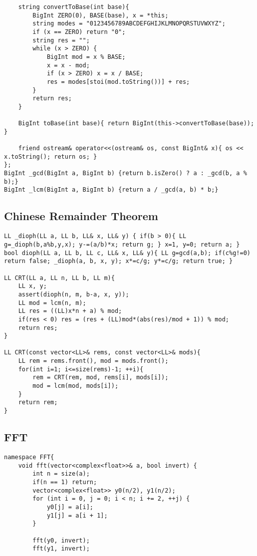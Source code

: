 \documentclass[12pt,a4paper,onesided]{article}
\begin{document}
\begin{multicols}{3}
\begin{lstlisting}
    string convertToBase(int base){
        BigInt ZERO(0), BASE(base), x = *this;
        string modes = "0123456789ABCDEFGHIJKLMNOPQRSTUVWXYZ";
        if (x == ZERO) return "0";
        string res = "";
        while (x > ZERO) {
            BigInt mod = x % BASE;
            x = x - mod;
            if (x > ZERO) x = x / BASE;
            res = modes[stoi(mod.toString())] + res;
        }
        return res;
    }

    BigInt toBase(int base){ return BigInt(this->convertToBase(base)); }

    friend ostream& operator<<(ostream& os, const BigInt& x){ os << x.toString(); return os; }
};
BigInt _gcd(BigInt a, BigInt b) {return b.isZero() ? a : _gcd(b, a % b);}
BigInt _lcm(BigInt a, BigInt b) {return a / _gcd(a, b) * b;}
\end{lstlisting}


\subsection{Chinese Remainder Theorem}
\begin{lstlisting}
LL _dioph(LL a, LL b, LL& x, LL& y) { if(b > 0){ LL g=_dioph(b,a%b,y,x); y-=(a/b)*x; return g; } x=1, y=0; return a; }
bool dioph(LL a, LL b, LL c, LL& x, LL& y){ LL g=gcd(a,b); if(c%g!=0) return false; _dioph(a, b, x, y); x*=c/g; y*=c/g; return true; }

LL CRT(LL a, LL n, LL b, LL m){
	LL x, y;
	assert(dioph(n, m, b-a, x, y));
	LL mod = lcm(n, m);
	LL res = ((LL)x*n + a) % mod;
	if(res < 0) res = (res + (LL)mod*(abs(res)/mod + 1)) % mod;
	return res;
}

LL CRT(const vector<LL>& rems, const vector<LL>& mods){
	LL rem = rems.front(), mod = mods.front();
	for(int i=1; i<=size(rems)-1; ++i){
		rem = CRT(rem, mod, rems[i], mods[i]);
		mod = lcm(mod, mods[i]);
	}
	return rem;
}

\end{lstlisting}


\subsection{FFT}
\begin{lstlisting}
namespace FFT{
	void fft(vector<complex<float>>& a, bool invert) {
		int n = size(a);
		if(n == 1) return;
		vector<complex<float>> y0(n/2), y1(n/2);
		for (int i = 0, j = 0; i < n; i += 2, ++j) {
			y0[j] = a[i];
			y1[j] = a[i + 1];
		}

		fft(y0, invert);
		fft(y1, invert);


\end{lstlisting}
\end{multicols}
\end{document}
